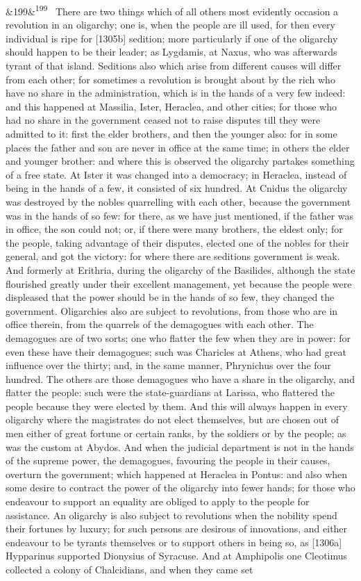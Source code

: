 \documentclass[12pt]{article}
\newcommand{\para}[1][]{\par\noindent\ifx&#1&\else\textsuperscript{\footnotesize #1}~\fi}
\begin{document}
\para[199] There are two things which of all others most evidently occasion a revolution in an oligarchy; one is, when the people are ill used, for then every individual is ripe for [1305b] sedition; more particularly if one of the oligarchy should happen to be their leader; as Lygdamis, at Naxus, who was afterwards tyrant of that island. Seditions also which arise from different causes will differ from each other; for sometimes a revolution is brought about by the rich who have no share in the administration, which is in the hands of a very few indeed: and this happened at Massilia, Ister, Heraclea, and other cities; for those who had no share in the government ceased not to raise disputes till they were admitted to it: first the elder brothers, and then the younger also: for in some places the father and son are never in office at the same time; in others the elder and younger brother: and where this is observed the oligarchy partakes something of a free state. At Ister it was changed into a democracy; in Heraclea, instead of being in the hands of a few, it consisted of six hundred. At Cnidus the oligarchy was destroyed by the nobles quarrelling with each other, because the government was in the hands of so few: for there, as we have just mentioned, if the father was in office, the son could not; or, if there were many brothers, the eldest only; for the people, taking advantage of their disputes, elected one of the nobles for their general, and got the victory: for where there are seditions government is weak. And formerly at Erithria, during the oligarchy of the Basilides, although the state flourished greatly under their excellent management, yet because the people were displeased that the power should be in the hands of so few, they changed the government. Oligarchies also are subject to revolutions, from those who are in office therein, from the quarrels of the demagogues with each other. The demagogues are of two sorts; one who flatter the few when they are in power: for even these have their demagogues; such was Charicles at Athens, who had great influence over the thirty; and, in the same manner, Phrynichus over the four hundred. The others are those demagogues who have a share in the oligarchy, and flatter the people: such were the state-guardians at Larissa, who flattered the people because they were elected by them. And this will always happen in every oligarchy where the magistrates do not elect themselves, but are chosen out of men either of great fortune or certain ranks, by the soldiers or by the people; as was the custom at Abydos. And when the judicial department is not in the hands of the supreme power, the demagogues, favouring the people in their causes, overturn the government; which happened at Heraclea in Pontus: and also when some desire to contract the power of the oligarchy into fewer hands; for those who endeavour to support an equality are obliged to apply to the people for assistance. An oligarchy is also subject to revolutions when the nobility spend their fortunes by luxury; for such persons are desirous of innovations, and either endeavour to be tyrants themselves or to support others in being so, as [1306a] Hypparinus supported Dionysius of Syracuse. And at Amphipolis one Cleotimus collected a colony of Chalcidians, and when they came set 
\end{document}
